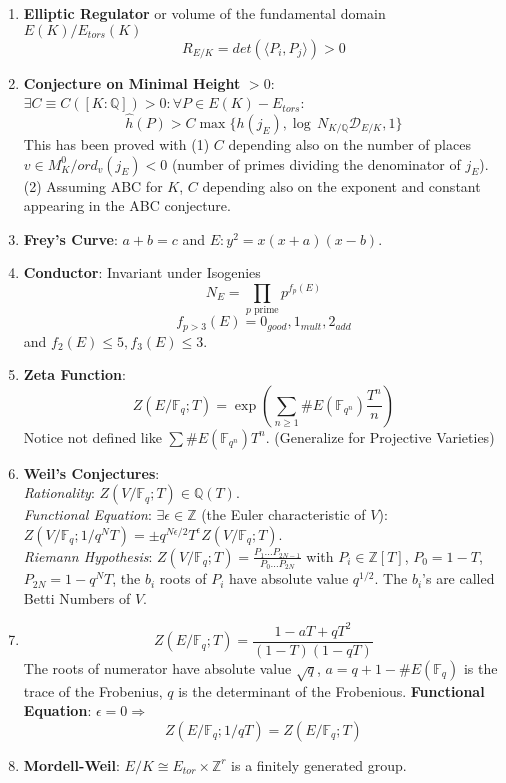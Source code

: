 \documentclass{article}
\newcommand{\Q}{\mathbb{Q}}
\newcommand{\Z}{\mathbb{Z}}
\newcommand{\F}{\mathbb{F}}
\newcommand{\DD}{\mathcal{D}}
\newcommand{\Ra}{\Rightarrow}
\begin{document}
\begin{multicols}{2}
\begin{enumerate}
\item \textbf{Elliptic Regulator} or volume of the fundamental domain $E(K)/E_{tors}(K)$
\[R_{E/K} = det(\langle P_i, P_j \rangle) > 0\] 

\item \textbf{Conjecture on Minimal Height} $> 0$: $\exists C \equiv C([K:\Q])>0: \forall P \in E(K)-E_{tors}$: 
\[\hat{h}(P) > C \max\{h(j_E), \log \, N_{K/\Q}\DD_{E/K}, 1\}\]
This has been proved with (1) $C$ depending also on the number of places $v \in M_K^0/ ord_v(j_E) < 0$ (number of primes dividing the denominator of $j_E$). (2) Assuming ABC for $K$, $C$ depending also on the exponent and constant appearing in the ABC conjecture. 

\item \textbf{Frey's Curve}: $a+b = c$ and $E:y^2 = x(x+a)(x-b)$.

\item \textbf{Conductor}: Invariant under Isogenies 
\[N_E = \prod_{p\textrm{ prime}} p^{f_p(E)}\]
\[f_{p> 3}(E) = 0_{good},1_{mult},2_{add}\]
and $f_2(E) \leq 5, f_3(E) \leq 3$.\\


\item \textbf{Zeta Function}: 
\[Z(E/\F_q;T) = \exp\left(\sum_{n \geq 1} \#E(\F_{q^n})\frac{T^n}{n}\right)\]
Notice not defined like $\sum \#E(\F_{q^n})T^n$. (Generalize for Projective Varieties)

\item \textbf{Weil's Conjectures}:\\
\textit{Rationality}: $Z(V/\F_q; T) \in \Q(T)$.\\
\textit{Functional Equation}: $\exists \epsilon \in \Z$ (the Euler characteristic of $V$): $Z(V/\F_q; 1/q^NT) = \pm q^{N\epsilon/2} T^\epsilon Z(V/\F_q; T)$. \\
\textit{Riemann Hypothesis}: $Z(V/\F_q;T) = \frac{P_1\ldots P_{2N-1}}{P_0\ldots P_{2N}}$ with $P_i \in \Z[T]$, $P_0 = 1-T$, $P_{2N} = 1-q^NT$, the $b_i$ roots of $P_i$ have absolute value $q^{1/2}$. The $b_i$'s are called Betti Numbers of $V$.

\item 
\[Z(E/\F_q;T) = \frac{1-aT+qT^2}{(1-T)(1-qT)}\]
The roots of numerator have absolute value $\sqrt{q}$, $a = q+1 - \#E(\F_q)$ is the trace of the Frobenius, $q$ is the determinant of the Frobenious. 
\textbf{Functional Equation}: $\epsilon = 0 \Ra$
\[ Z(E/\F_q; 1/qT) = Z(E/\F_q; T)\]


\item \textbf{Mordell-Weil}: $E/K \cong E_{tor} \times \Z^r$ is a finitely generated group. \\


\end{enumerate}
\end{multicols}
\end{document}
